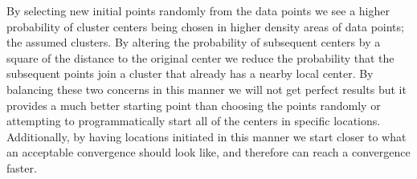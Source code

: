 \documentclass[]{article}
\begin{document}
By selecting new initial points randomly from the data points we see a higher probability of cluster centers being chosen in higher density areas of data points; the assumed clusters. 
By altering the probability of subsequent centers by a square of the distance to the original center we reduce the probability that the subsequent points join a cluster that already has a nearby local center.
By balancing these two concerns in this manner we will not get perfect results but it provides a much better starting point than choosing the points randomly or attempting to programmatically start all of the centers in specific locations.
Additionally, by having locations initiated in this manner we start closer to what an acceptable convergence should look like, and therefore can reach a convergence faster.
\end{document}
